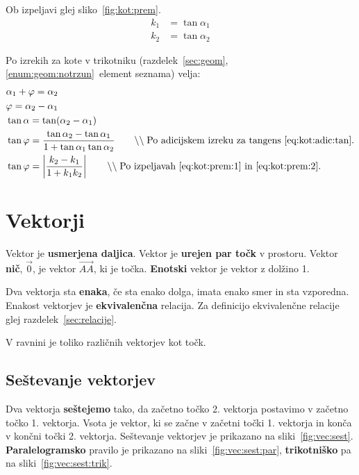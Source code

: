 \documentclass[a4paper,oneside,12pt,fleqn]{article}
\newcommand{\comment}[1]{\ensuremath{\qquad\backslash\backslash\;}\textnormal{#1}}
\def\Vec{\overrightarrow}
\numberwithin{equation}{section}
\begin{document}
Ob izpeljavi glej sliko~\ref{fig:kot:prem}.
\begin{align}
  k_1 &= \tan\alpha_1 \label{eq:kot:prem:1} \\
  k_2 &= \tan\alpha_2 \label{eq:kot:prem:2}
\end{align}

Po izrekih za kote v trikotniku (razdelek~\ref{sec:geom},
\ref{enum:geom:notrzun}~element seznama) velja:
\begin{align*}
  & \alpha_1 + \varphi = \alpha_2 \\
  & \varphi = \alpha_2 - \alpha_1 \\
  & \tan\alpha = \tan(\alpha_2 - \alpha_1) \\
  & \tan\varphi = \frac{\tan\alpha_2 - \tan\alpha_1}{1+\tan\alpha_1\tan\alpha_2}
  \comment{Po adicijskem izreku za tangens~\eqref{eq:kot:adic:tan}.} \\
  & \tan\varphi = \left| \frac{k_2-k_1}{1+k_1k_2} \right| \comment{Po
  izpeljavah~\eqref{eq:kot:prem:1} in~\eqref{eq:kot:prem:2}.}
\end{align*}

\section{Vektorji}
\label{sec:vec}
Vektor je \textbf{usmerjena daljica}. Vektor je \textbf{urejen par točk} v prostoru.
Vektor \textbf{nič}, $\vec{0}$, je vektor $\Vec{AA}$, ki je točka.
\textbf{Enotski} vektor je vektor z dolžino 1.

Dva vektorja sta \textbf{enaka}, če sta enako dolga, imata enako smer in sta vzporedna.
Enakost vektorjev je \textbf{ekvivalenčna} relacija. Za definicijo ekvivalenčne relacije glej
razdelek~\ref{sec:relacije}.

V ravnini je toliko različnih vektorjev kot točk.

\subsection{Seštevanje vektorjev}
\label{sec:vec:sest}
Dva vektorja \textbf{seštejemo} tako, da začetno točko 2. vektorja postavimo v začetno točko 1. vektorja. Vsota je vektor, ki
se začne v začetni točki 1. vektorja in konča v končni točki 2. vektorja. Seštevanje
vektorjev je prikazano na sliki~\ref{fig:vec:sest}.
\textbf{Paralelogramsko} pravilo je prikazano na sliki~\ref{fig:vec:sest:par},
\textbf{trikotniško} pa na
sliki~\ref{fig:vec:sest:trik}.
\end{document}
